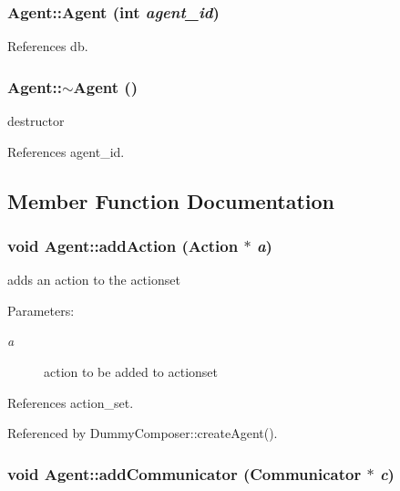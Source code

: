 \subsubsection[Agent]{\setlength{\rightskip}{0pt plus 5cm}Agent::Agent (int {\em agent\_\-id})}\label{classAgent_9bdb60eaf7b1967cb0e77665af1d0d4e}




References db.
\subsubsection[$\sim$Agent]{\setlength{\rightskip}{0pt plus 5cm}Agent::$\sim$Agent ()}\label{classAgent_b8dd8d152605cf1339fed595376e83cb}


destructor 



References agent\_\-id.

\subsection{Member Function Documentation}
\subsubsection[addAction]{\setlength{\rightskip}{0pt plus 5cm}void Agent::addAction ({\bf Action} $\ast$ {\em a})}\label{classAgent_f03cb3281f45d966a5df796d9922e955}


adds an action to the actionset \begin{Desc}
\item[Parameters:]
\begin{description}
\item[{\em a}]action to be added to actionset \end{description}
\end{Desc}


References action\_\-set.

Referenced by DummyComposer::createAgent().
\subsubsection[addCommunicator]{\setlength{\rightskip}{0pt plus 5cm}void Agent::addCommunicator ({\bf Communicator} $\ast$ {\em c})}\label{classAgent_4d1723cd30329f5da052fee0dc6fa5ef}


